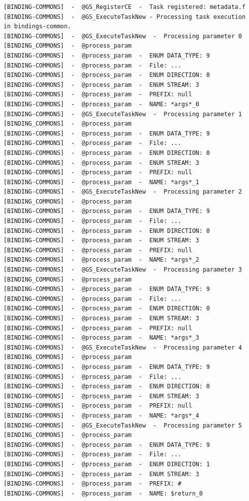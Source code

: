 \begin{verbatim}
[BINDING-COMMONS]  -  @GS_RegisterCE  -  Task registered: metadata.f
[BINDING-COMMONS]  -  @GS_ExecuteTaskNew - Processing task execution in bindings-common. 
[BINDING-COMMONS]  -  @GS_ExecuteTaskNew  -  Processing parameter 0
[BINDING_COMMONS]  -  @process_param
[BINDING-COMMONS]  -  @process_param  -  ENUM DATA_TYPE: 9
[BINDING-COMMONS]  -  @process_param  -  File: ...
[BINDING-COMMONS]  -  @process_param  -  ENUM DIRECTION: 0
[BINDING-COMMONS]  -  @process_param  -  ENUM STREAM: 3
[BINDING-COMMONS]  -  @process_param  -  PREFIX: null
[BINDING-COMMONS]  -  @process_param  -  NAME: *args*_0
[BINDING-COMMONS]  -  @GS_ExecuteTaskNew  -  Processing parameter 1
[BINDING_COMMONS]  -  @process_param
[BINDING-COMMONS]  -  @process_param  -  ENUM DATA_TYPE: 9
[BINDING-COMMONS]  -  @process_param  -  File: ...
[BINDING-COMMONS]  -  @process_param  -  ENUM DIRECTION: 0
[BINDING-COMMONS]  -  @process_param  -  ENUM STREAM: 3
[BINDING-COMMONS]  -  @process_param  -  PREFIX: null
[BINDING-COMMONS]  -  @process_param  -  NAME: *args*_1
[BINDING-COMMONS]  -  @GS_ExecuteTaskNew  -  Processing parameter 2
[BINDING_COMMONS]  -  @process_param
[BINDING-COMMONS]  -  @process_param  -  ENUM DATA_TYPE: 9
[BINDING-COMMONS]  -  @process_param  -  File: ...
[BINDING-COMMONS]  -  @process_param  -  ENUM DIRECTION: 0
[BINDING-COMMONS]  -  @process_param  -  ENUM STREAM: 3
[BINDING-COMMONS]  -  @process_param  -  PREFIX: null
[BINDING-COMMONS]  -  @process_param  -  NAME: *args*_2
[BINDING-COMMONS]  -  @GS_ExecuteTaskNew  -  Processing parameter 3
[BINDING_COMMONS]  -  @process_param
[BINDING-COMMONS]  -  @process_param  -  ENUM DATA_TYPE: 9
[BINDING-COMMONS]  -  @process_param  -  File: ...
[BINDING-COMMONS]  -  @process_param  -  ENUM DIRECTION: 0
[BINDING-COMMONS]  -  @process_param  -  ENUM STREAM: 3
[BINDING-COMMONS]  -  @process_param  -  PREFIX: null
[BINDING-COMMONS]  -  @process_param  -  NAME: *args*_3
[BINDING-COMMONS]  -  @GS_ExecuteTaskNew  -  Processing parameter 4
[BINDING_COMMONS]  -  @process_param
[BINDING-COMMONS]  -  @process_param  -  ENUM DATA_TYPE: 9
[BINDING-COMMONS]  -  @process_param  -  File: ...
[BINDING-COMMONS]  -  @process_param  -  ENUM DIRECTION: 0
[BINDING-COMMONS]  -  @process_param  -  ENUM STREAM: 3
[BINDING-COMMONS]  -  @process_param  -  PREFIX: null
[BINDING-COMMONS]  -  @process_param  -  NAME: *args*_4
[BINDING-COMMONS]  -  @GS_ExecuteTaskNew  -  Processing parameter 5
[BINDING_COMMONS]  -  @process_param
[BINDING-COMMONS]  -  @process_param  -  ENUM DATA_TYPE: 9
[BINDING-COMMONS]  -  @process_param  -  File: ...
[BINDING-COMMONS]  -  @process_param  -  ENUM DIRECTION: 1
[BINDING-COMMONS]  -  @process_param  -  ENUM STREAM: 3
[BINDING-COMMONS]  -  @process_param  -  PREFIX: #
[BINDING-COMMONS]  -  @process_param  -  NAME: $return_0
\end{verbatim}

